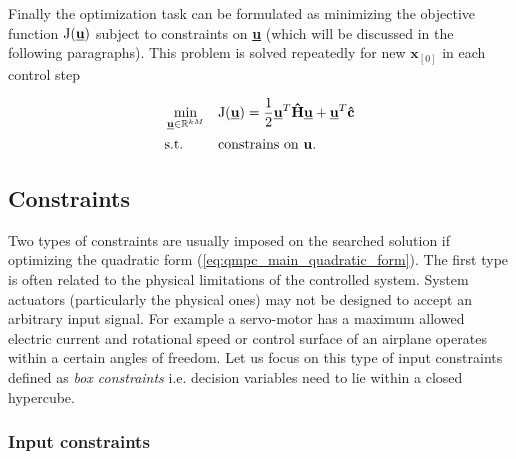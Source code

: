 Finally the optimization task can be formulated as minimizing the objective function $\mathrm{J}(\textbf{\underline{u}})$ subject to constraints on \textbf{\underline{u}} (which will be discussed in the following paragraphs). This problem is solved repeatedly for new $\textbf{x}_{[0]}$ in each control step

\begin{equation}
\label{eq:qmpc_main_quadratic_form}
\begin{aligned}
& \min_{\textbf{\underline{u}} \in \mathbb{R}^{kM}}
& & \mathrm{J}(\underline{\textbf{u}}) = \frac{1}{2}\textbf{\underline{u}}^T\textbf{\^H}\textbf{\underline{u}} + \textbf{\underline{u}}^T\textbf{\^c}\\
& \text{s.t.}
& & \text{constrains on \textbf{u}}.
\end{aligned}
\end{equation}


\subsection{Constraints}

Two types of constraints are usually imposed on the searched solution if optimizing the quadratic form (\ref{eq:qmpc_main_quadratic_form}). The first type is often related to the physical limitations of the controlled system. System actuators (particularly the physical ones) may not be designed to accept an arbitrary input signal. For example a servo-motor has a maximum allowed electric current and rotational speed or control surface of an airplane operates within a certain angles of freedom. Let us focus on this type of input constraints defined as \textit{box constraints} i.e. decision variables need to lie within a closed hypercube.

\subsubsection{Input constraints}


